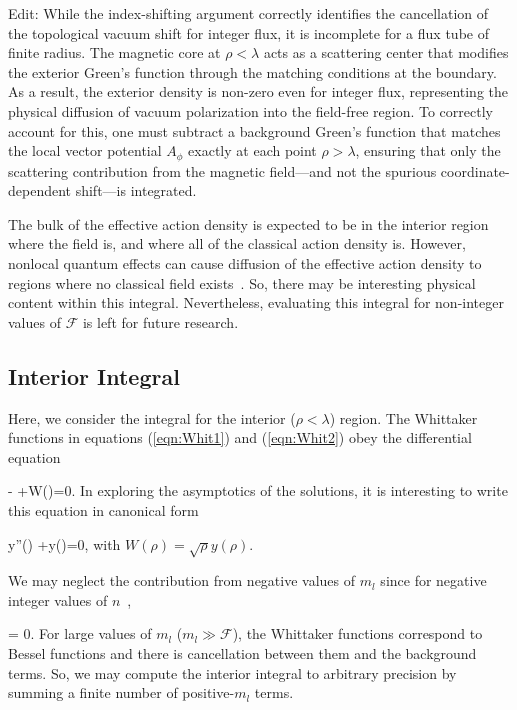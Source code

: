 Edit: While the index-shifting argument correctly identifies the cancellation of the topological vacuum shift for integer flux, it is incomplete for a flux tube of finite radius. The magnetic core at $\rho < \lambda$ acts as a scattering center that modifies the exterior Green's function through the matching conditions at the boundary. As a result, the exterior density is non-zero even for integer flux, representing the physical diffusion of vacuum polarization into the field-free region. To correctly account for this, one must subtract a background Green's function that matches the local vector potential $A_\phi$ exactly at each point $\rho > \lambda$, ensuring that only the scattering contribution from the magnetic field—and not the spurious coordinate-dependent shift—is integrated.

The bulk of the effective action density is expected to be 
in the interior region where the field is, and 
where all of the classical action density is. However, nonlocal quantum effects can
cause diffusion of the effective action density to regions where 
no classical field exists~\cite{Gies:2001zp}. So, there may be interesting 
physical content within this integral.
Nevertheless, evaluating this integral for non-integer values of $\mathcal{F}$ is 
left for future research.

\subsection{Interior Integral}

Here, we consider the integral for the interior ($\rho < \lambda$) region.  
The Whittaker functions in equations (\ref{eqn:Whit1}) and (\ref{eqn:Whit2}) obey the differential
equation

\be 
{} -  +W(\rho)=0.
\ee 
In exploring the asymptotics of the solutions, it is interesting to write this equation in 
canonical form

\be 
\label{eqn:canonical}
y''(\rho) +y(\rho)=0,
\ee 
with $W(\rho)=\sqrt{\rho}y(\rho)$.

We may neglect the contribution from negative values of $m_l$ since for negative integer values of $n$~\cite{slater1960confluent},

\be 
	 = 0.
\ee 
For large values of $m_l$ ($m_l \gg \mathcal{F}$), the Whittaker functions correspond to Bessel 
functions and there is cancellation between them and the background terms.  So, we may compute the 
interior integral to arbitrary precision by summing a finite number of positive-$m_l$ terms.

